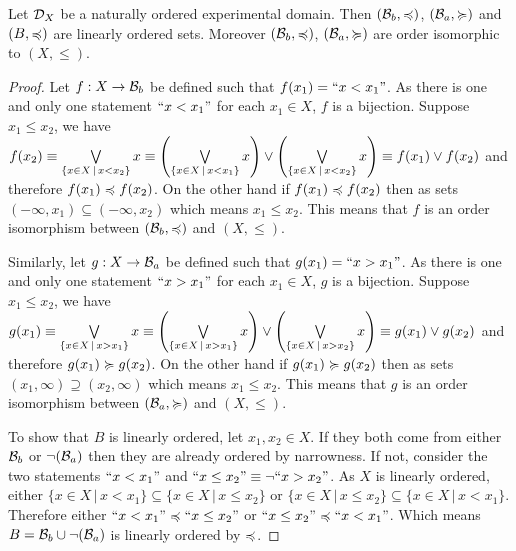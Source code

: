 \documentclass[11pt,letterpaper,fleqn]{memoir} %
\begin{document}
\begin{mathSection}
\begin{prop}\label{3_prop_basis_ordering}
	Let $\mathcal{D}_X$ be a naturally ordered experimental domain. Then $(\mathcal{B}_b, \preccurlyeq)$, $(\mathcal{B}_a, \succcurlyeq)$ and $(B, \preccurlyeq)$ are linearly ordered sets. Moreover $(\mathcal{B}_b, \preccurlyeq)$, $(\mathcal{B}_a, \succcurlyeq)$ are order isomorphic to $(X, \leq)$.
\end{prop}
\begin{proof}
	Let $f : X \to \mathcal{B}_b$ be defined such that $f(x_1) = ``x < x_1"$. As there is one and only one statement $``x < x_1"$ for each $x_1 \in X$, $f$ is a bijection. Suppose $x_1 \leq x_2$, we have $f(x_2) \equiv \bigvee\limits_{\{x \in X \, | \, x < x_2\}} x \equiv \left( \bigvee\limits_{\{x \in X \, | \, x < x_1\}} x\right) \vee \left( \bigvee\limits_{\{x \in X \, | \, x < x_2\}} x \right)\equiv f(x_1) \vee f(x_2)$ and therefore $f(x_1) \preccurlyeq f(x_2)$. On the other hand if $f(x_1) \preccurlyeq f(x_2)$ then as sets $(-\infty, x_1) \subseteq (-\infty, x_2)$ which means $x_1 \leq x_2$. This means that $f$ is an order isomorphism between $(\mathcal{B}_b, \preccurlyeq)$ and $(X, \leq)$.
	
	Similarly, let $g : X \to \mathcal{B}_a$ be defined such that $g(x_1) = ``x > x_1"$. As there is one and only one statement $``x > x_1"$ for each $x_1 \in X$, $g$ is a bijection. Suppose $x_1 \leq x_2$, we have $g(x_1) \equiv \bigvee\limits_{\{x \in X \, | \, x > x_1\}} x \equiv \left( \bigvee\limits_{\{x \in X \, | \, x > x_1\}} x \right) \vee \left(\bigvee\limits_{\{x \in X \, | \, x > x_2\}} x \right) \equiv g(x_1) \vee g(x_2)$ and therefore $g(x_1) \succcurlyeq g(x_2)$. On the other hand if $g(x_1) \succcurlyeq g(x_2)$ then as sets $(x_1, \infty) \supseteq (x_2, \infty)$ which means $x_1 \leq x_2$. This means that $g$ is an order isomorphism between $(\mathcal{B}_a, \succcurlyeq)$ and $(X, \leq)$.
	
	To show that $B$ is linearly ordered, let $x_1, x_2 \in X$. If they both come from either $\mathcal{B}_b$ or $\neg(\mathcal{B}_a)$ then they are already ordered by narrowness. If not, consider the two statements $``x < x_1"$ and $``x \leq x_2"\equiv \neg ``x > x_2"$. As $X$ is linearly ordered, either $\{x \in X \, | \, x < x_1\} \subseteq \{x \in X \, | \, x \leq x_2\}$ or $\{x \in X \, | \, x \leq x_2\} \subseteq \{x \in X \, | \, x < x_1\}$. Therefore either $``x < x_1" \preccurlyeq ``x \leq x_2"$ or $``x \leq x_2" \preccurlyeq ``x < x_1"$. Which means $B = \mathcal{B}_b \cup \neg(\mathcal{B}_a)$ is linearly ordered by $\preccurlyeq$.
\end{proof}


\end{mathSection}
\end{document}
